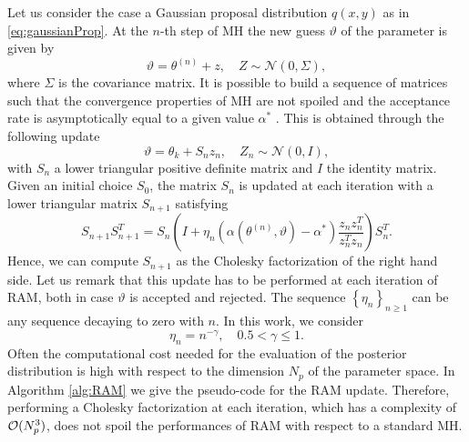Let us consider the case a Gaussian proposal distribution $q(x,y)$ as in \eqref{eq:gaussianProp}. At the $n$-th step of MH the new guess $\vartheta$ of the parameter is given by
\begin{equation}
\vartheta = \theta^{(n)} + z, \quad Z \sim \mathcal{N}(0, \Sigma),
\end{equation}
where $\Sigma$ is the covariance matrix. It is possible to build a sequence of matrices such that the convergence properties of MH are not spoiled and the acceptance rate is asymptotically equal to a given value $\alpha^*$ \cite{Vih12}. This is obtained through the following update 
\begin{equation}
\vartheta = \theta_k + S_n z_n, \quad Z_n \sim \mathcal{N}(0, I),
\end{equation}
with $S_n$ a lower triangular positive definite matrix and $I$ the identity matrix. Given an initial choice $S_0$, the matrix $S_n$ is updated at each iteration with a lower triangular matrix $S_{n+1}$ satisfying
\begin{equation}\label{eq:RAMupdate}
S_{n+1}S_{n+1}^T = S_n\left(I + \eta_n\left(\alpha(\theta^{(n)}, \vartheta) - \alpha^*\right)\frac{z_nz_n^T}{z_n^Tz_n}\right)S_n^T.
\end{equation}
Hence, we can compute $S_{n+1}$ as the Cholesky factorization of the right hand side. Let us remark that this update has to be performed at each iteration of RAM, both in case $\vartheta$ is accepted and rejected. The sequence $\left\{\eta_n\right\}_{n\geq 1}$ can be any sequence decaying to zero with $n$. In this work, we consider
\begin{equation}
\eta_n = n^{-\gamma}, \quad 0.5 < \gamma \leq 1.
\end{equation}
Often the computational cost needed for the evaluation of the posterior distribution is high with respect to the dimension $N_p$ of the parameter space. In Algorithm \ref{alg:RAM} we give the pseudo-code for the RAM update. Therefore, performing a Cholesky factorization at each iteration, which has a complexity of $\mathcal{O}(N_p^3)$, does not spoil the performances of RAM with respect to a standard MH.

